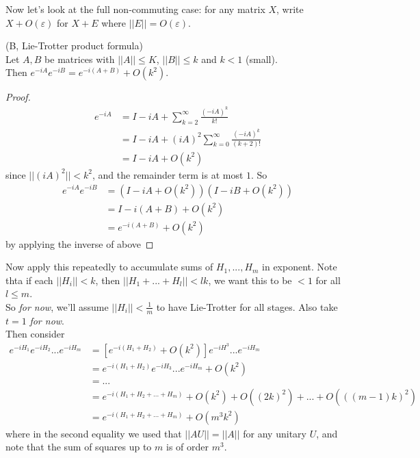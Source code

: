 \documentclass[a4paper]{article}
\begin{document}
Now let's look at the full non-commuting case: for any matrix $X$, write $X+O(\varepsilon)$ for $X+E$ where $||E|| = O(\varepsilon)$.

\begin{lemma} (B, Lie-Trotter product formula)\\
    Let $A,B$ be matrices with $||A|| \leq K$, $||B|| \leq k$ and $k<1$ (small).\\
    Then $e^{-iA} e^{-iB} = e^{-i(A+B)} + O(k^2)$.
    \begin{proof}
        \begin{equation*}
            \begin{aligned}
                e^{-iA} &= I-iA + \sum_{k=2}^\infty \frac{(-iA)^k}{k!}\\
                &= I-iA + (iA)^2 \sum_{k=0}^\infty \frac{(-iA)^k}{(k+2)!}\\
                &= I-iA + O(k^2)
            \end{aligned}
        \end{equation*}
        since $||(iA)^2|| < k^2$, and the remainder term is at most $1$. So
        \begin{equation*}
            \begin{aligned}
                e^{-iA} e^{-iB} &= (I-iA + O(k^2)) (I-iB + O(k^2))\\
                &= I-i(A+B) + O(k^2)\\
                &= e^{-i(A+B)} + O(k^2)
            \end{aligned}
        \end{equation*}
        by applying the inverse of above
    \end{proof}
\end{lemma}
Now apply this repeatedly to accumulate sums of $H_1,...,H_m$ in exponent. Note thta if each $||H_i|| < k$, then $||H_1+...+H_l|| < lk$, we want this to be $<1$ for all $l\leq m$.\\
So \emph{for now}, we'll assume $||H_i|| < \frac{1}{m}$ to have Lie-Trotter for all stages. Also take $t=1$ \emph{for now}.\\
Then consider
\begin{equation*}
    \begin{aligned}
        e^{-iH_1} e^{-iH_2}...e^{-iH_m} &= \left[e^{-i(H_1+H_2)}+O(k^2)\right] e^{-iH^3} ... e^{-iH_m}\\
        &= e^{-i(H_1+H_2)} e^{-iH_3} ... e^{-iH_m} + O(k^2)\\
        &= ...\\
        &= e^{-i(H_1+H_2+...+H_m)} +O(k^2)+O((2k)^2)+...+O(((m-1)k)^2)\\
        &= e^{-i(H_1+H_2+...+H_m)} + O(m^3k^2)
    \end{aligned}
\end{equation*}
where in the second equality we used that $||AU|| = ||A||$ for any unitary $U$, and note that the sum of squares up to $m$ is of order $m^3$.
\end{document}
